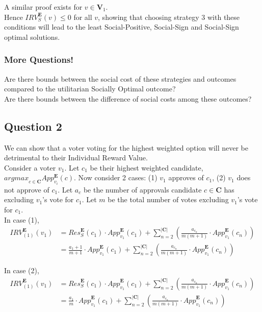 \documentclass{article}
\begin{document}
A similar proof exists for $v \in \boldsymbol{V}_{1}$.\\
Hence ${IRV}^{\boldsymbol{E}}_{S}(v) \leq 0$ for all $v$, showing that choosing strategy 3 with these conditions will lead to the least Social-Positive, Social-Sign and Social-Sign optimal solutions. 

\subsubsection{More Questions!}

Are there bounds between the social cost of these strategies and outcomes compared to the utilitarian Socially Optimal outcome?\\
Are there bounds between the difference of social costs among these outcomes?

\subsection{Question 2}
We can show that a voter voting for the highest weighted option will never be detrimental to their Individual Reward Value.\\

Consider a voter $v_{1}$. Let $c_{1}$ be their highest weighted candidate, ${argmax}_{c \in \boldsymbol{C}}App^{\boldsymbol{E}}_{v_{i}}(c)$. Now consider 2 cases: (1) $v_{1}$ approves of $c_{1}$, (2) $v_{1}$ does not approve of $c_{1}$. Let $a_{c}$ be the number of approvals candidate $c \in \boldsymbol{C}$ has excluding $v_{1}$'s vote for $c_{1}$. Let $m$ be the total number of votes excluding $v_{1}$'s vote for $c_{1}$.\\

In case (1), 
\begin{equation}
\begin{aligned}
{IRV}^{\boldsymbol{E}}_{(1)}(v_1) 
&= {Res}^{\boldsymbol{E}}_{S}(c_1)\cdot{App}^{\boldsymbol{E}}_{v_1}(c_1) + \sum^{|\boldsymbol{C}|}_{n = 2}{\left(\frac{a_{c_n}}{m(m+1)}\cdot{App}^{\boldsymbol{E}}_{v_1}(c_{n})\right)}\\
&= \frac{a_1+1}{m+1}\cdot{App}^{\boldsymbol{E}}_{v_1}(c_1) + \sum^{|\boldsymbol{C}|}_{n = 2}{\left(\frac{a_{c_n}}{m(m+1)}\cdot{App}^{\boldsymbol{E}}_{v_1}(c_{n})\right)}
\end{aligned}  
\end{equation}

In case (2), 
\begin{equation}
\begin{aligned}
{IRV}^{\boldsymbol{E}}_{(1)}(v_1) 
&= {Res}^{\boldsymbol{E}}_{S}(c_1)\cdot{App}^{\boldsymbol{E}}_{v_1}(c_1) + \sum^{|\boldsymbol{C}|}_{n = 2}{\left(\frac{a_{c_n}}{m(m+1)}\cdot{App}^{\boldsymbol{E}}_{v_1}(c_{n})\right)}\\
&= \frac{a_1}{m}\cdot{App}^{\boldsymbol{E}}_{v_1}(c_1) + \sum^{|\boldsymbol{C}|}_{n = 2}{\left(\frac{a_{c_n}}{m(m+1)}\cdot{App}^{\boldsymbol{E}}_{v_1}(c_{n})\right)}
\end{aligned}  
\end{equation}
\end{document}
